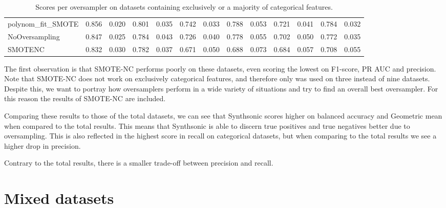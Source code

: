 \begin{table}[ht]
{\begin{tabular}{l|rr|rr|rr|rr|rr|rr}
        polynom\_fit\_SMOTE &              0.856 &                  0.020 &   0.801 &       0.035 &  0.742 &   0.033 &      0.788 &          0.053 &   0.721 &       0.041 &   0.784 &       0.032 \\
        NoOversampling    &              0.847 &                  0.025 &   0.784 &       0.043 &  0.726 &   0.040 &      0.778 &          0.055 &   0.702 &       0.050 &   0.772 &       0.035 \\
        SMOTENC           &              0.832 &                  0.030 &   0.782 &       0.037 &  0.671 &   0.050 &      0.688 &          0.073 &   0.684 &       0.057 &   0.708 &       0.055 \\
    \bottomrule
    \end{tabular}}
\caption{Scores per oversampler on datasets containing exclusively or a majority of categorical features.}
\label{tab:categorical}
\end{table}

The first observation is that SMOTE-NC performs poorly on these datasets, even scoring the lowest on F1-score, PR AUC and precision. Note that SMOTE-NC does not work on exclusively categorical features, and therefore only was used on three instead of nine datasets. Despite this, we want to portray how oversamplers perform in a wide variety of situations and try to find an overall best oversampler. For this reason the results of SMOTE-NC are included.

Comparing these results to those of the total datasets, we can see that Synthsonic scores higher on balanced accuracy and Geometric mean when compared to the total results. This means that Synthsonic is able to discern true positives and true negatives better due to oversampling. This is also reflected in the highest score in recall on categorical datasets, but when comparing to the total results we see a higher drop in precision. 

Contrary to the total results, there is a smaller trade-off between precision and recall.

\section{Mixed datasets}


